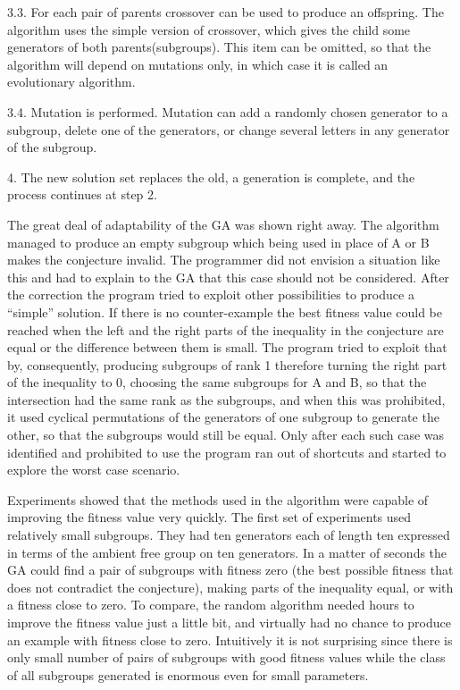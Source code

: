 \documentclass[11pt]{article}
\begin{document}
3.3. For each pair of parents crossover can be used to produce an
offspring. The algorithm uses the simple version of crossover, which
gives the child some generators of both parents(subgroups). This item
can be omitted, so that the algorithm will depend on mutations only,
in which case it is called an evolutionary algorithm.

3.4. Mutation is performed. Mutation can add a randomly chosen
generator to a subgroup, delete one of the generators, or change several
letters in any generator of the subgroup.

4. The new solution set replaces the old, a generation is complete,
and the process continues at step 2.

\vspace{5mm}

The great deal of adaptability of the GA was shown right away. The
algorithm managed to produce an empty subgroup which being used in
place of A or B makes the conjecture invalid. The programmer did not
envision a situation like this and had to explain to the GA that this
case should not be considered. After the correction the program tried
to exploit other possibilities to produce a ``simple'' solution. If
there is no counter-example the best fitness value could be reached
when the left and the right parts of the inequality in the conjecture
are equal or the difference between them is small. The program tried
to exploit that by, consequently, producing subgroups of rank 1
therefore turning the right part of the inequality to 0, choosing the
same subgroups for A and B, so that the intersection had the same rank
as the subgroups, and when this was prohibited, it used cyclical
permutations of the generators of one subgroup to generate the other,
so that the subgroups would still be equal. Only after each such case
was identified and prohibited to use the program ran out of shortcuts
and started to explore the worst case scenario. 

Experiments showed that the methods used in the algorithm were capable
of improving the fitness value very quickly. The first set of
experiments used relatively small subgroups. They had ten generators
each of length ten expressed in terms of the ambient free group on ten
generators. In a matter of seconds the GA could find a pair of
subgroups with fitness zero (the best possible fitness that does not
contradict the conjecture), making parts of the inequality equal, or
with a fitness close to zero. To compare, the random algorithm needed
hours to improve the fitness value just a little bit, and virtually
had no chance to produce an example with fitness close to
zero. Intuitively it is not surprising since there is only small
number of pairs of subgroups with good fitness values while the class
of all subgroups generated is enormous even for small parameters.
\end{document}
